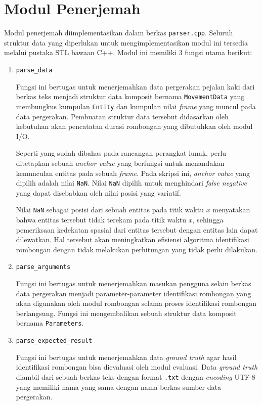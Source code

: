 \section{Modul Penerjemah}
\label{sec:impl-parser}

Modul penerjemah diimplementasikan dalam berkas \texttt{parser.cpp}. Seluruh struktur data yang diperlukan untuk mengimplementasikan modul ini tersedia melalui pustaka STL bawaan C++. Modul ini memiliki 3 fungsi utama berikut:

\begin{enumerate}
    \item \texttt{parse\_data}
    
    Fungsi ini bertugas untuk menerjemahkan data pergerakan pejalan kaki dari berkas teks menjadi struktur data komposit bernama \texttt{MovementData} yang membungkus kumpulan \texttt{Entity} dan kumpulan nilai \textit{frame} yang muncul pada data pergerakan. Pembuatan struktur data tersebut didasarkan oleh kebutuhan akan pencatatan durasi rombongan yang dibutuhkan oleh modul I/O.
    
    Seperti yang sudah dibahas pada rancangan perangkat lunak, perlu ditetapkan sebuah \textit{anchor value} yang berfungsi untuk menandakan kemunculan entitas pada sebuah \textit{frame}. Pada skripsi ini, \textit{anchor value} yang dipilih adalah nilai \texttt{NaN}. Nilai \texttt{NaN} dipilih untuk menghindari \textit{false negative} yang dapat disebabkan oleh nilai posisi yang variatif.

    Nilai \texttt{NaN} sebagai posisi dari sebuah entitas pada titik waktu $x$ menyatakan bahwa entitas tersebut tidak terekam pada titik waktu $x$, sehingga pemeriksaan kedekatan spasial dari entitas tersebut dengan entitas lain dapat dilewatkan. Hal tersebut akan meningkatkan efisiensi algoritma identifikasi rombongan dengan tidak melakukan perhitungan yang tidak perlu dilakukan. 
    
    \item \texttt{parse\_arguments}
    
    Fungsi ini bertugas untuk menerjemahkan masukan pengguna selain berkas data pergerakan menjadi parameter-parameter identifikasi rombongan yang akan digunakan oleh modul rombongan selama proses identifikasi rombongan berlangsung. Fungsi ini mengembalikan sebuah struktur data komposit bernama \texttt{Parameters}.
    
    \item \texttt{parse\_expected\_result}
    
    Fungsi ini bertugas untuk menerjemahkan data \textit{ground truth} agar hasil identifikasi rombongan bisa dievaluasi oleh modul evaluasi. Data \textit{ground truth} diambil dari sebuah berkas teks dengan format \texttt{.txt} dengan \textit{encoding} UTF-8 yang memiliki nama yang sama dengan nama berkas sumber data pergerakan. 
\end{enumerate}

